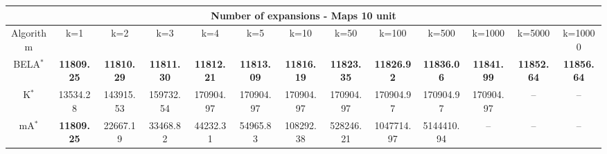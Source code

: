 \begin{tabular}{c|cccccccccccc}\toprule
\multicolumn{13}{c}{Number of expansions - Maps 10 unit}\\ \midrule
Algorithm & k=1 & k=2 & k=3 & k=4 & k=5 & k=10 & k=50 & k=100 & k=500 & k=1000 & k=5000 & k=10000 \\ \midrule
BELA$^*$ & \textbf{11809.25} & \textbf{11810.29} & \textbf{11811.30} & \textbf{11812.21} & \textbf{11813.09} & \textbf{11816.19} & \textbf{11823.35} & \textbf{11826.92} & \textbf{11836.06} & \textbf{11841.99} & \textbf{11852.64} & \textbf{11856.64} \\
K$^*$ & 13534.28 & 143915.53 & 159732.54 & 170904.97 & 170904.97 & 170904.97 & 170904.97 & 170904.97 & 170904.97 & 170904.97 & -- & -- \\
mA$^*$ & \textbf{11809.25} & 22667.19 & 33468.82 & 44232.31 & 54965.83 & 108292.38 & 528246.21 & 1047714.97 & 5144410.94 & -- & -- & -- \\ \bottomrule 
\end{tabular}
